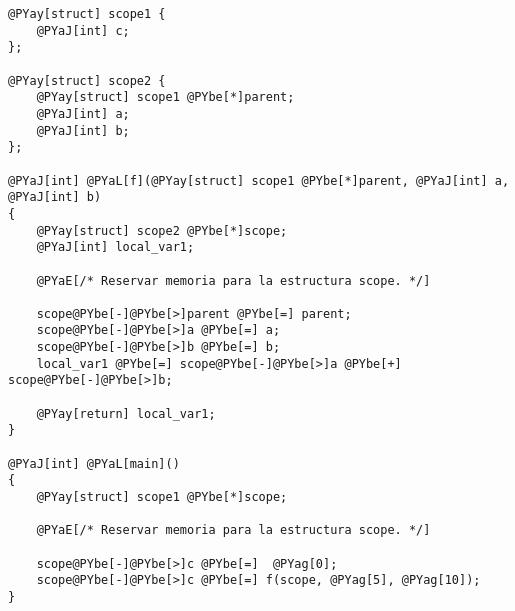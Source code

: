 \begin{Verbatim}[commandchars=@\[\]]
@PYay[struct] scope1 {
    @PYaJ[int] c;
};

@PYay[struct] scope2 {
    @PYay[struct] scope1 @PYbe[*]parent;
    @PYaJ[int] a;
    @PYaJ[int] b;
};

@PYaJ[int] @PYaL[f](@PYay[struct] scope1 @PYbe[*]parent, @PYaJ[int] a, @PYaJ[int] b)
{
    @PYay[struct] scope2 @PYbe[*]scope;
    @PYaJ[int] local_var1;

    @PYaE[/* Reservar memoria para la estructura scope. */]

    scope@PYbe[-]@PYbe[>]parent @PYbe[=] parent;
    scope@PYbe[-]@PYbe[>]a @PYbe[=] a;
    scope@PYbe[-]@PYbe[>]b @PYbe[=] b;
    local_var1 @PYbe[=] scope@PYbe[-]@PYbe[>]a @PYbe[+] scope@PYbe[-]@PYbe[>]b;

    @PYay[return] local_var1;
}

@PYaJ[int] @PYaL[main]()
{
    @PYay[struct] scope1 @PYbe[*]scope;

    @PYaE[/* Reservar memoria para la estructura scope. */]

    scope@PYbe[-]@PYbe[>]c @PYbe[=]  @PYag[0];
    scope@PYbe[-]@PYbe[>]c @PYbe[=] f(scope, @PYag[5], @PYag[10]);
}
\end{Verbatim}
